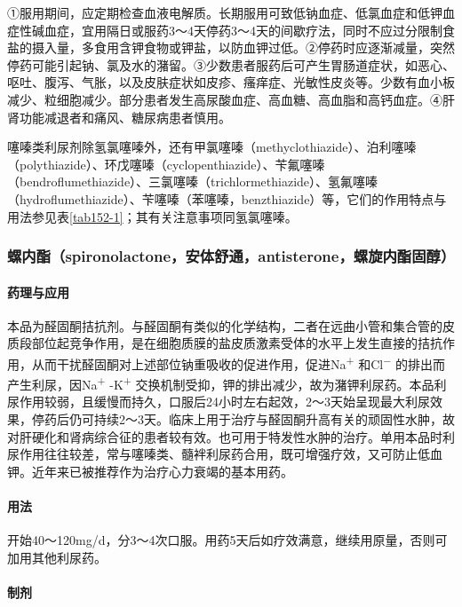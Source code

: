 ①服用期间，应定期检查血液电解质。长期服用可致低钠血症、低氯血症和低钾血症性碱血症，宜用隔日或服药3～4天停药3～4天的间歇疗法，同时不应过分限制食盐的摄入量，多食用含钾食物或钾盐，以防血钾过低。②停药时应逐渐减量，突然停药可能引起钠、氯及水的潴留。③少数患者服药后可产生胃肠道症状，如恶心、呕吐、腹泻、气胀，以及皮肤症状如皮疹、瘙痒症、光敏性皮炎等。少数有血小板减少、粒细胞减少。部分患者发生高尿酸血症、高血糖、高血脂和高钙血症。④肝肾功能减退者和痛风、糖尿病患者慎用。

噻嗪类利尿剂除氢氯噻嗪外，还有甲氯噻嗪（methyclothiazide）、泊利噻嗪（polythiazide）、环戊噻嗪（cyclopenthiazide）、苄氟噻嗪（bendroflumethiazide）、三氯噻嗪（trichlormethiazide）、氢氟噻嗪（hydroflumethiazide）、苄噻嗪（苯噻嗪，benzthiazide）等，它们的作用特点与用法参见表\ref{tab152-1}；其有关注意事项同氢氯噻嗪。

\subsubsection{螺内酯（spironolactone，安体舒通，antisterone，螺旋内酯固醇）}

\paragraph{药理与应用}

本品为醛固酮拮抗剂。与醛固酮有类似的化学结构，二者在远曲小管和集合管的皮质段部位起竞争作用，是在细胞质膜的盐皮质激素受体的水平上发生直接的拮抗作用，从而干扰醛固酮对上述部位钠重吸收的促进作用，促进Na\textsuperscript{+}
和Cl\textsuperscript{−} 的排出而产生利尿，因Na\textsuperscript{+}
-K\textsuperscript{+}
交换机制受抑，钾的排出减少，故为潴钾利尿药。本品利尿作用较弱，且缓慢而持久，口服后24小时左右起效，2～3天始呈现最大利尿效果，停药后仍可持续2～3天。临床上用于治疗与醛固酮升高有关的顽固性水肿，故对肝硬化和肾病综合征的患者较有效。也可用于特发性水肿的治疗。单用本品时利尿作用往往较差，常与噻嗪类、髓袢利尿药合用，既可增强疗效，又可防止低血钾。近年来已被推荐作为治疗心力衰竭的基本用药。

\paragraph{用法}

开始40～120mg/d，分3～4次口服。用药5天后如疗效满意，继续用原量，否则可加用其他利尿药。

\paragraph{制剂}

